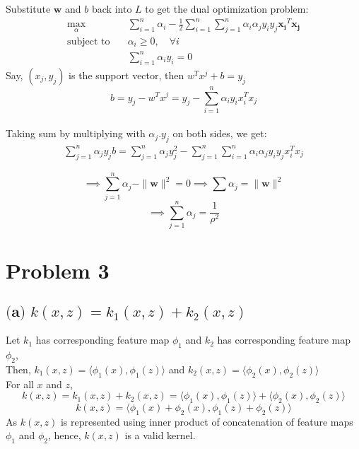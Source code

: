 \documentclass[12pt]{article}
\begin{document}
Substitute $\mathbf{w}$ and $b$ back into $L$ to get the dual optimization problem:
\begin{equation}
    \begin{aligned}
        \max_{\alpha} \quad & \sum_{i=1}^{n} \alpha_i - \frac{1}{2} \sum_{i=1}^{n} \sum_{j=1}^{n} \alpha_i \alpha_j y_i y_j \mathbf{x_i}^T \mathbf{x_j} \\
        \text{subject to} \quad & \alpha_i \geq 0, \quad \forall i \\
        & \sum_{i=1}^{n} \alpha_i y_i = 0
    \end{aligned}
\end{equation}  
Say, $(x_j, y_j)$ is the support vector, then $w^T x^j + b = y_j$ \\
$$  b = y_j - w^T x^j = y_j - \sum_{i=1}^{n} \alpha_i y_i x_i^T x_j$$ \\
Taking sum by multiplying with $\alpha_j . y_j$ on both sides, we get:
\begin{equation}
    \begin{aligned}
        \sum_{j=1}^{n} \alpha_j y_j b = \sum_{j=1}^{n} \alpha_j y_j^2 - \sum_{j=1}^{n} \sum_{i=1}^{n} \alpha_i \alpha_j y_i y_j x_i^T x_j
    \end{aligned}
\end{equation}

$$ \implies \sum_{j=1}^n \alpha_j - \|\mathbf{w}\|^2 = 0 \implies \sum \alpha_j = \|\mathbf{w}\|^2 $$
$$ \implies \sum_{j=1}^n \alpha_j = \frac{1}{\rho^2} $$

\section*{Problem 3}
\subsection*{$ \textbf{(a) } k(x, z) = k_1(x, z) + k_2(x, z) $}
Let $k_1$ has corresponding feature map $\phi_1$ and $k_2$ has corresponding feature map $\phi_2$, \\
Then, $k_1(x, z) = \langle \phi_1(x), \phi_1(z) \rangle$ and $k_2(x, z) = \langle \phi_2(x), \phi_2(z) \rangle$ \\
For all $x$ and $z$, 
$$ k(x, z) = k_1(x, z) + k_2(x, z) = \langle \phi_1(x), \phi_1(z) \rangle + \langle \phi_2(x), \phi_2(z) \rangle $$
$$ k(x, z) = \langle \phi_1(x) + \phi_2(x), \phi_1(z) + \phi_2(z) \rangle $$
As $k(x, z)$ is represented using inner product of concatenation of feature maps $\phi_1$ and $\phi_2$,
hence, $k(x, z)$ is a valid kernel.
 
\end{document}
